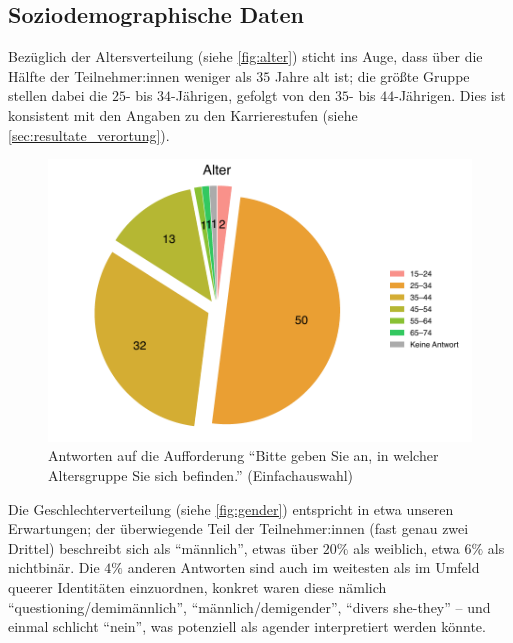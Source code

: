 \documentclass{scrartcl}
\begin{document}
\subsection{Soziodemographische Daten}\label{sec:resultate_soziodemographie}
Bezüglich der Altersverteilung (siehe \autoref{fig:alter}) sticht ins Auge, dass über die Hälfte der Teilnehmer:innen weniger als $35$ Jahre alt ist; die größte Gruppe stellen dabei die $25$- bis $34$-Jährigen, gefolgt von den $35$- bis $44$-Jährigen.
Dies ist konsistent mit den Angaben zu den Karrierestufen (siehe \autoref{sec:resultate_verortung}).

\begin{figure}[ht]
   \includegraphics[width=1\textwidth]{alter.pdf}
   \caption{Antworten auf die Aufforderung \enquote{Bitte geben Sie an, in welcher Altersgruppe Sie sich befinden.} (Einfachauswahl)}
   \label{fig:alter}
\end{figure}

Die Geschlechterverteilung (siehe \autoref{fig:gender}) entspricht in etwa unseren Erwartungen; der überwiegende Teil der Teilnehmer:innen (fast genau zwei Drittel) beschreibt sich als \enquote{männlich}, etwas über $20\%$ als weiblich, etwa $6\%$ als nichtbinär.
Die $4\%$ anderen Antworten sind auch im weitesten als im Umfeld queerer Identitäten einzuordnen, konkret waren diese nämlich \enquote{questioning/demimännlich}, \enquote{männlich/demigender}, \enquote{divers she-they} -- und einmal schlicht \enquote{nein}, was potenziell als agender interpretiert werden könnte.
\end{document}
